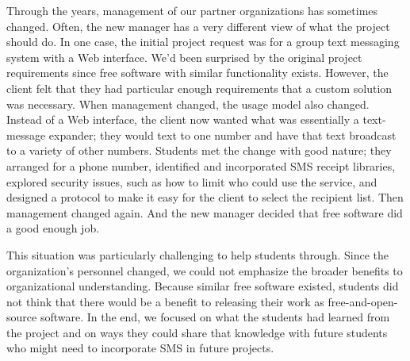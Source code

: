 Through the years, management of our partner organizations has
sometimes changed.  Often, the new manager has a very different
view of what the project should do.  In one case, the initial project
request was for a group text messaging system with a Web interface.
We'd been surprised by the original project requirements since
free software with similar functionality exists.  However, the
client felt that they had particular enough requirements that a custom
solution was necessary.  When management changed, the usage model
also changed.  Instead of a Web interface, the client now wanted
what was essentially a text-message expander; they would text to
one number and have that text broadcast to a variety of other
numbers.  Students met the change with good nature; they arranged
for a phone number, identified and incorporated SMS receipt libraries,
explored security issues, such as how to limit who could use the
service, and designed a protocol to make it easy for the client to
select the recipient list.  Then management changed again.  And the
new manager decided that free software did a good enough job.

This situation was particularly challenging to help students through.
Since the organization's personnel changed, we could not emphasize
the broader benefits to organizational understanding.  Because
similar free software existed, students did not think that there
would be a benefit to releasing their work as free-and-open-source
software.  In the end, we focused on what the students had learned
from the project and on ways they could share that knowledge with
future students who might need to incorporate SMS in future projects.

